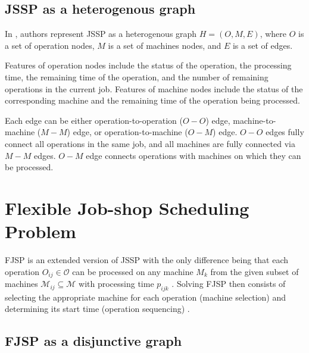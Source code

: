 \subsection{JSSP as a heterogenous graph} \label{JSSP as a heterogenous graph}

In \cite{10226873}, authors represent JSSP as a heterogenous graph $H = (O, M, E)$, where $O$ is a set of operation nodes, $M$ is a set of machines nodes, and $E$ is a set of edges.
\par
Features of operation nodes include the status of the operation, the processing time, the remaining time of the operation, and the number of remaining operations in the current job. Features of machine nodes include the status of the corresponding machine and the remaining time of the operation being processed.
\par
Each edge can be either operation-to-operation ($O-O$) edge, machine-to-machine ($M-M$) edge, or operation-to-machine ($O-M$) edge. $O-O$ edges fully connect all operations in the same job, and all machines are fully connected via $M-M$ edges. $O-M$ edge connects operations with machines on which they can be processed.

\section{Flexible Job-shop Scheduling Problem}

FJSP is an extended version of JSSP with the only difference being that each operation $O_{ij} \in \mathcal{O}$ can be processed on any machine $M_k$ from the given subset of machines $\mathcal{M}_{ij} \subseteq \mathcal{M}$ with processing time $p_{ijk}$ \cite{9826438}. Solving FJSP then consists of selecting the appropriate machine for each operation (machine selection) and determining its start time (operation sequencing) \cite{https://doi.org/10.1049/iet-cim.2018.0009}. 

\subsection{FJSP as a disjunctive graph}

